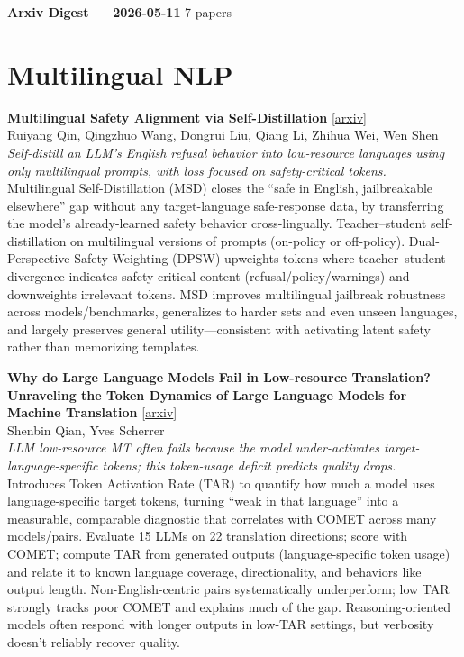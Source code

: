 \documentclass[12pt,letterpaper]{article}
\begin{document}
{\footnotesize\textbf{Arxiv Digest --- 2026-05-11} \hfill 7 papers}

\smallskip

\section*{Multilingual NLP}

{\small\textbf{Multilingual Safety Alignment via Self-Distillation}} {\scriptsize[\href{https://arxiv.org/abs/2605.02971}{arxiv}]}\\
{\scriptsize Ruiyang Qin, Qingzhuo Wang, Dongrui Liu, Qiang Li, Zhihua Wei, Wen Shen}\\

{\small\textit{Self-distill an LLM's English refusal behavior into low-resource languages using only multilingual prompts, with loss focused on safety-critical tokens.}}\\[1pt]
{\footnotesize Multilingual Self-Distillation (MSD) closes the ``safe in English, jailbreakable elsewhere'' gap without any target-language safe-response data, by transferring the model's already-learned safety behavior cross-lingually. Teacher--student self-distillation on multilingual versions of prompts (on-policy or off-policy). Dual-Perspective Safety Weighting (DPSW) upweights tokens where teacher--student divergence indicates safety-critical content (refusal/policy/warnings) and downweights irrelevant tokens. MSD improves multilingual jailbreak robustness across models/benchmarks, generalizes to harder sets and even unseen languages, and largely preserves general utility---consistent with activating latent safety rather than memorizing templates.}

\medskip

{\small\textbf{Why do Large Language Models Fail in Low-resource Translation? Unraveling the Token Dynamics of Large Language Models for Machine Translation}} {\scriptsize[\href{https://arxiv.org/abs/2605.07533}{arxiv}]}\\
{\scriptsize Shenbin Qian, Yves Scherrer}\\

{\small\textit{LLM low-resource MT often fails because the model under-activates target-language-specific tokens; this token-usage deficit predicts quality drops.}}\\[1pt]
{\footnotesize Introduces Token Activation Rate (TAR) to quantify how much a model uses language-specific target tokens, turning ``weak in that language'' into a measurable, comparable diagnostic that correlates with COMET across many models/pairs. Evaluate 15 LLMs on 22 translation directions; score with COMET; compute TAR from generated outputs (language-specific token usage) and relate it to known language coverage, directionality, and behaviors like output length. Non-English-centric pairs systematically underperform; low TAR strongly tracks poor COMET and explains much of the gap. Reasoning-oriented models often respond with longer outputs in low-TAR settings, but verbosity doesn't reliably recover quality.}
\end{document}

